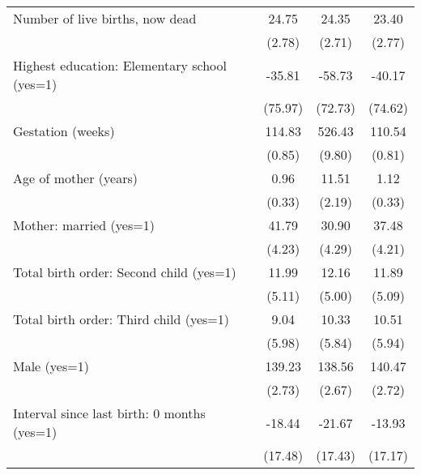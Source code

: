{\begin{tabular}{l*{4}{c}}
Number of live births, now dead                   &            &       24.75&       24.35&       23.40\\
                                                  &            &      (2.78)&      (2.71)&      (2.77)\\
Highest education: Elementary school (yes=1)      &            &      -35.81&      -58.73&      -40.17\\
                                                  &            &     (75.97)&     (72.73)&     (74.62)\\
Gestation (weeks)                                 &            &      114.83&      526.43&      110.54\\
                                                  &            &      (0.85)&      (9.80)&      (0.81)\\
Age of mother (years)                             &            &        0.96&       11.51&        1.12\\
                                                  &            &      (0.33)&      (2.19)&      (0.33)\\
Mother: married (yes=1)                           &            &       41.79&       30.90&       37.48\\
                                                  &            &      (4.23)&      (4.29)&      (4.21)\\
Total birth order: Second child (yes=1)           &            &       11.99&       12.16&       11.89\\
                                                  &            &      (5.11)&      (5.00)&      (5.09)\\
Total birth order: Third child (yes=1)            &            &        9.04&       10.33&       10.51\\
                                                  &            &      (5.98)&      (5.84)&      (5.94)\\
Male (yes=1)                                      &            &      139.23&      138.56&      140.47\\
                                                  &            &      (2.73)&      (2.67)&      (2.72)\\
Interval since last birth: 0 months (yes=1)       &            &      -18.44&      -21.67&      -13.93\\
                                                  &            &     (17.48)&     (17.43)&     (17.17)\\

\end{tabular}}
